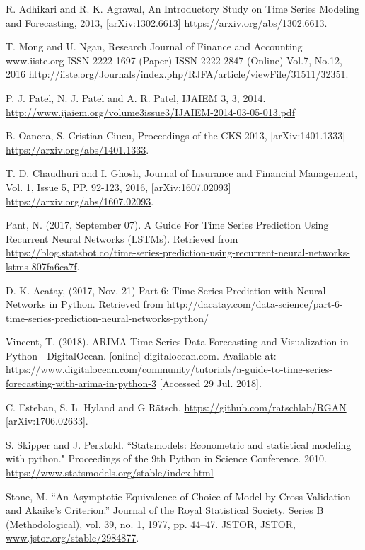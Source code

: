 \documentclass[10pt,a4paper]{article}
\begin{document}
\newpage
\begin{thebibliography}{9}

R. Adhikari and R. K. Agrawal, An Introductory Study on Time Series Modeling and Forecasting, 2013, [arXiv:1302.6613] \url{https://arxiv.org/abs/1302.6613}.

T. Mong and U. Ngan, Research Journal of Finance and Accounting www.iiste.org
ISSN 2222-1697 (Paper) ISSN 2222-2847 (Online)
Vol.7, No.12, 2016 \url{http://iiste.org/Journals/index.php/RJFA/article/viewFile/31511/32351}.

 P. J. Patel,  N. J. Patel and A. R. Patel, IJAIEM 3, 3, 2014. \url{http://www.ijaiem.org/volume3issue3/IJAIEM-2014-03-05-013.pdf}

 B. Oancea, S. Cristian Ciucu, Proceedings of the CKS 2013, [arXiv:1401.1333] \url{https://arxiv.org/abs/1401.1333}.

 T. D. Chaudhuri and I. Ghosh,	Journal of Insurance and Financial Management, Vol. 1, Issue 5, PP. 92-123, 2016,  [arXiv:1607.02093] \url{https://arxiv.org/abs/1607.02093}.

 Pant, N. (2017, September 07). A Guide For Time Series Prediction Using Recurrent Neural Networks (LSTMs). Retrieved from \url{https://blog.statsbot.co/time-series-prediction-using-recurrent-neural-networks-lstms-807fa6ca7f}.


 D. K. Acatay, (2017, Nov. 21) Part 6: Time Series Prediction with Neural Networks in Python. Retrieved from \url{http://dacatay.com/data-science/part-6-time-series-prediction-neural-networks-python/}

 Vincent, T. (2018). ARIMA Time Series Data Forecasting and Visualization in Python | DigitalOcean. [online] digitalocean.com. Available at: \url{https://www.digitalocean.com/community/tutorials/a-guide-to-time-series-forecasting-with-arima-in-python-3} [Accessed 29 Jul. 2018].

 C. Esteban, S. L. Hyland and G R\"{a}tsch, \url{https://github.com/ratschlab/RGAN} [arXiv:1706.02633]. 

 S. Skipper and J. Perktold. ``Statsmodels: Econometric and statistical modeling with python." Proceedings of the 9th Python in Science Conference. 2010. \url{https://www.statsmodels.org/stable/index.html}

 Stone, M. ``An Asymptotic Equivalence of Choice of Model by Cross-Validation and Akaike's Criterion.” Journal of the Royal Statistical Society. Series B (Methodological), vol. 39, no. 1, 1977, pp. 44–47. JSTOR, JSTOR, \url{www.jstor.org/stable/2984877}.



\end{thebibliography}
\end{document}

